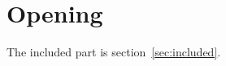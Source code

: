 \documentclass{article}
\begin{document}
\section{Opening}\label{sec:opening}
The included part is section~\ref{sec:included}.

\end{document}
